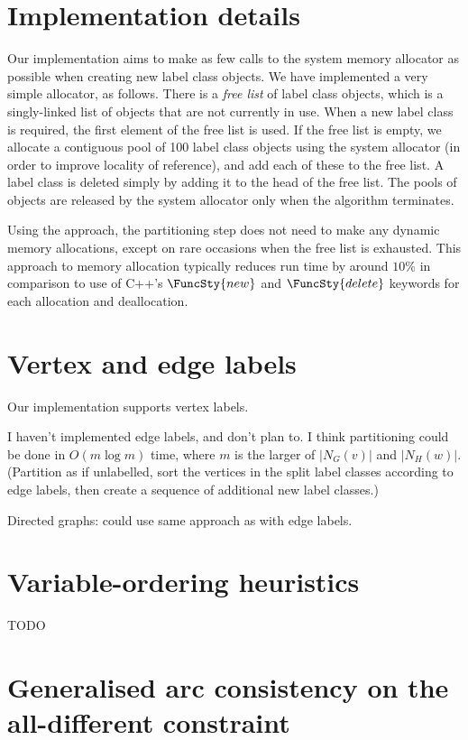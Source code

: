 \section{Implementation details}

Our implementation aims to make as few calls to the system memory allocator as possible when creating
new label class objects.  We have implemented a very simple allocator, as follows.  There is a \emph{free list}
of label class objects, which is a singly-linked list of objects that are not currently in use.  When
a new label class is required, the first element of the free list is used.  If the free list is empty,
we allocate a contiguous pool of 100 label class objects using the system allocator (in order to improve
locality of reference), and add each of these to the free list.  A label class is deleted simply by
adding it to the head of the free list.  The pools of objects are released by the system allocator only when
the algorithm terminates.

Using the approach, the partitioning step does not need to make any dynamic memory allocations, except
on rare occasions when the free list is exhausted.
This approach to memory allocation typically reduces run time by around $10\%$ in comparison to use of
C++'s $\FuncSty{new}$ and $\FuncSty{delete}$ keywords for each allocation and deallocation.

\section{Vertex and edge labels}

Our implementation supports vertex labels.

I haven't implemented edge labels, and don't plan to.
I think partitioning could be done in $O(m \log m)$ time, where
$m$ is the larger of $|N_G(v)|$ and $|N_H(w)|$. (Partition as if unlabelled, sort the vertices in
the split label classes according to edge labels, then create a sequence of additional new label classes.)

Directed graphs: could use same approach as with edge labels.

\section{Variable-ordering heuristics}

TODO

\section{Generalised arc consistency on the all-different constraint}

